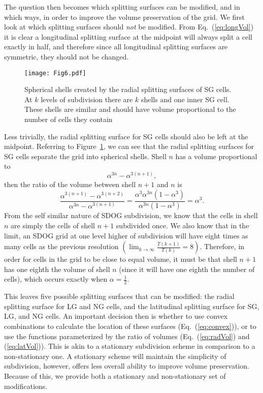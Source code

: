 The question then becomes which splitting surfaces can be modified, and in which ways, in order to improve the volume preservation of the grid.
We first look at which splitting surfaces should \textit{not} be modified.
From Eq.~(\ref{eq:longVol}) it is clear a longitudinal splitting surface at the midpoint will always split a cell exactly in half, and therefore since all longitudinal splitting surfaces are symmetric, they should not be changed.


\begin{figure}[tbp]
	\texttt{[image: Fig6.pdf]}
	\caption{Spherical shells created by the radial splitting surfaces of SG cells.
		At $k$ levels of subdivision there are $k$ shells and one inner SG cell.
		These shells are similar and should have volume proportional to the number of cells they contain}
	\label{fig:sg-rad-splits}
\end{figure}


Less trivially, the radial splitting surface for SG cells should also be left at the midpoint.
Referring to Figure~\ref{fig:sg-rad-splits}, we can see that the radial splitting surfaces for SG cells separate the grid into spherical shells.
Shell $n$ has a volume proportional to
%
\begin{equation}
\alpha^{3n} - \alpha^{3 \left( n + 1 \right)},
\end{equation}
%
then the ratio of the volume between shell $n+1$ and $n$ is
%
\begin{equation}
\frac{ \alpha^{3 \left(n + 1 \right)} - \alpha^{3\left( n + 2 \right)} }{ \alpha^{3n} - \alpha^{3 \left( n + 1 \right)} } = \frac{ \alpha^{3} \alpha^{3n} \left( 1 - \alpha^{3} \right) }{ \alpha^{3n} \left( 1 - \alpha^{3} \right) } = \alpha^{3}.
\end{equation}
%
From the self similar nature of SDOG subdivision, we know that the cells in shell $n$ are simply the cells of shell $n+1$ subdivided once.
We also know that in the limit, an SDOG grid at one level higher of subdivision will have eight times as many cells as the previous resolution $\left( \lim_{k \to \infty} \frac{ T(k+1) }{ T(k) }  = 8 \right)$.
Therefore, in order for cells in the grid to be close to equal volume, it must be that shell $n+1$ has one eighth the volume of shell $n$ (since it will have one eighth the number of cells), which occurs exactly when $\alpha = \frac{1}{2}$.


This leaves five possible splitting surfaces that can be modified: the radial splitting surface for LG and NG cells, and the latitudinal splitting surface for SG, LG, and NG cells.
An important decision then is whether to use convex combinations to calculate the location of these surfaces (Eq.~(\ref{eq:convex})), or to use the functions parameterized by the ratio of volumes (Eq.~(\ref{eq:radVol}) and (\ref{eq:latVol})).
This is akin to a stationary subdivision scheme in comparison to a non-stationary one.
A stationary scheme will maintain the simplicity of subdivision, however, offers less overall ability to improve volume preservation.
Because of this, we provide both a stationary and non-stationary set of modifications.


